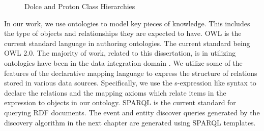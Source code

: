 \begin{figure}[ht]
\begin{minipage}[b]{0.45\linewidth}
\end{minipage}
\caption{Dolce and Proton Class Hierarchies}
\label{fig:ontology-hierarchies}
\end{figure}

In our work, we use ontologies to model key pieces of knowledge. This includes the type of objects and relationships they are expected to have. OWL is the current standard language in authoring ontologies. The current standard being OWL 2.0. The majority of work, related to this dissertation, is in utilizing ontologies have been in the data integration domain \cite{smith2007obo, noy2004semantic, astakhov2005data}. We utilize some of the features of the declarative mapping language \cite{dou2005ontology} to express the structure of relations stored in various data sources. Specifically, we use the s-expression like syntax to declare the relations and the mapping axioms which relate items in the expression to objects in our ontology. SPARQL \cite{prud2008sparql} is the current standard for querying RDF documents. The event and entity discover queries generated by the discovery algorithm in the next chapter are generated using SPARQL templates.


